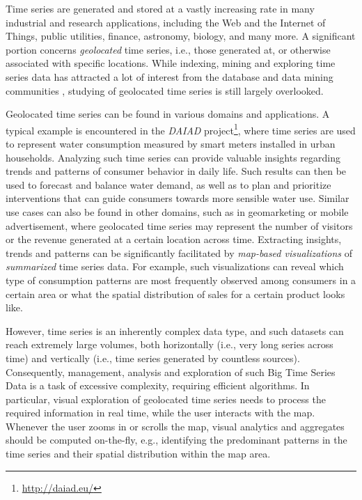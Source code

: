 Time series are generated and stored at a vastly increasing rate in many industrial and research applications, including the Web and the Internet of Things, public utilities, finance, astronomy, biology, and many more. A significant portion concerns \emph{geolocated} time series, i.e., those generated at, or otherwise associated with specific locations. While indexing, mining and exploring time series data has attracted a lot of interest from the database and data mining communities \cite{camerra2014kais,ding2008pvldb,shieh2008kdd,paraskevopoulos2017icdm}, studying of geolocated time series is still largely overlooked.

Geolocated time series can be found in various domains and applications. A typical example is encountered in the \textit{DAIAD} project\footnote{\url{http://daiad.eu/}}, where time series are used to represent water consumption measured by smart meters installed in urban households. Analyzing such time series can provide valuable insights regarding trends and patterns of consumer behavior in daily life. Such results can then be used to forecast and balance water demand, as well as to plan and prioritize interventions that can guide consumers towards more sensible water use. Similar use cases can also be found in other domains, such as in geomarketing or mobile advertisement, where geolocated time series may represent the number of visitors or the revenue generated at a certain location across time. Extracting insights, trends and patterns can be significantly facilitated by {\em map-based visualizations} of {\em summarized} time series data. For example, such visualizations can reveal which type of consumption patterns are most frequently observed among consumers in a certain area or what the spatial distribution of sales for a certain product looks like. 

However, time series is an inherently complex data type, and such datasets can reach extremely large volumes, both horizontally (i.e., very long series across time) and vertically (i.e., time series generated by countless sources). Consequently, management, analysis and exploration of such Big Time Series Data is a task of excessive complexity, requiring efficient algorithms. In particular, visual exploration of geolocated time series needs to process the required information in real time, while the user interacts with the map. Whenever the user zooms in or scrolls the map, visual analytics and aggregates should be computed on-the-fly, e.g., identifying the predominant patterns in the time series and their spatial distribution within the map area.

